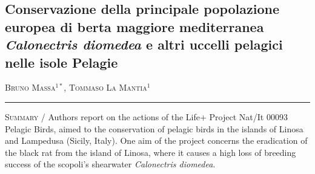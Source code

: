 \setcounter{figure}{0}
\setcounter{table}{0}

\begin{adjustwidth}{-3.5cm}{0cm}
\pagestyle{CIOpage}
\chapter*[Conservazione degli uccelli pelagici nelle isole Pelagie]{Conservazione della principale popolazione europea di berta
maggiore mediterranea \textbf{\textit{Calonectris diomedea}}\textbf{ e
altri uccelli pelagici nelle isole Pelagie}}

\textsc{Bruno Massa}$^{1*}$, \textsc{Tommaso La Mantia}$^{1}$ \\

 
\noindent\color{MUSEBLUE}\rule{27cm}{2pt}
\vspace{1cm}
\end{adjustwidth}



{\small
\noindent \textsc{\color{MUSEBLUE} Summary} / Authors report on the actions of the Life+ Project Nat/It 00093
{\textquotedbl}Pelagic Birds{\textquotedbl}, aimed to the conservation
of pelagic birds in the islands of Linosa and Lampedusa (Sicily,
Italy). One aim of the project concerns the eradication of the black
rat from the island of Linosa, where it causes a high loss of breeding
success of the scopoli's shearwater \textit{Calonectris diomedea}.\\
}

